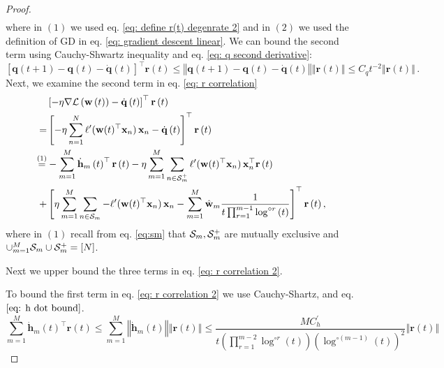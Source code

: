 \documentclass[twoside,11pt,english]{article}
\begin{document}
\begin{proof}
\begin{align}
\end{align}
where in $\left(1\right)$ we used eq. \ref{eq: define r(t) degenrate 2}
and in $\left(2\right)$ we used the definition of GD in eq. \ref{eq: gradient descent linear}.
We can bound the second term using Cauchy-Shwartz inequality and eq.
\ref{eq: q second derivative}:
\[
\left[\mathbf{q}\left(t+1\right)-\mathbf{q}\left(t\right)-\dot{\mathbf{q}}\left(t\right)\right]^{\top}\mathbf{r}\left(t\right)\leq\left\Vert \mathbf{q}\left(t+1\right)-\mathbf{q}\left(t\right)-\dot{\mathbf{q}}\left(t\right)\right\Vert \left\Vert \mathbf{r}\left(t\right)\right\Vert \leq C_{q}t^{-2}\left\Vert \mathbf{r}\left(t\right)\right\Vert \,.
\]
Next, we examine the second term in eq. \ref{eq: r correlation}
\begin{align}
 & \left[-\eta\nabla\mathcal{L}\left(\mathbf{w}\left(t\right)\right)-\dot{\mathbf{q}}\left(t\right)\right]^{\top}\mathbf{r}\left(t\right)\nonumber \\
= & \left[-\eta\sum_{n=1}^{N}\ell'(\mathbf{w}(t)^{\top}\mathbf{x}_{n})\,\mathbf{x}_{n}-\dot{\mathbf{q}}\left(t\right)\right]^{\top}\mathbf{r}\left(t\right)\nonumber \\
\overset{(1)}= & -\sum_{m=1}^{M}\dot{\mathbf{h}}_{m}\left(t\right)^{\top}\mathbf{r}\left(t\right)-\eta\sum_{m=1}^{M}\sum_{n\in\mathcal{S}_{m}^{+}}\ell'(\mathbf{w}(t)^{\top}\mathbf{x}_{n})\,\mathbf{x}_{n}^{\top}\mathbf{r}\left(t\right)\nonumber \\
+ & \left[\eta\sum_{m=1}^{M}\sum_{n\in\mathcal{S}_{m}}-\ell'(\mathbf{w}(t)^{\top}\mathbf{x}_{n})\,\mathbf{x}_{n}-\sum_{m=1}^{M}\hat{\mathbf{w}}_{m}\frac{1}{t\prod_{r=1}^{m-1}\log^{\circ r}\left(t\right)}\right]^{\top}\mathbf{r}\left(t\right),\label{eq: r correlation 2}
\end{align}
where in $(1)$ recall from eq. \ref{eq:sm} that $\mathcal{S}_m,\mathcal{S}_m^+$ are mutually exclusive and $\cup_{m=1}^M \mathcal{S}_m \cup \mathcal{S}_m^+=[N]$.

Next we upper bound the three terms in eq. \ref{eq: r correlation 2}.

To bound the first term in eq. \ref{eq: r correlation 2} we use Cauchy-Shartz,
and eq. $\ref{eq: h dot bound}$.
\[
\sum_{m=1}^{M}\dot{\mathbf{h}}_{m}\left(t\right)^{\top}\mathbf{r}\left(t\right)\leq\sum_{m=1}^{M}\left\Vert \dot{\mathbf{h}}_{m}\left(t\right)\right\Vert \left\Vert \mathbf{r}\left(t\right)\right\Vert \leq\frac{MC_{h}^{\prime}}{t\left(\prod_{r=1}^{m-2}\log^{\circ r}\left(t\right)\right)\left(\log^{\circ (m-1)}\left(t\right)\right)^{2}}\left\Vert \mathbf{r}\left(t\right)\right\Vert 
\]


\end{proof}
\end{document}
